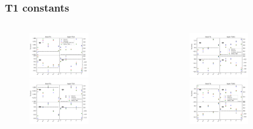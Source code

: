 \documentclass[aspectratio=1610, 12pt]{beamer}
\begin{document}
\begin{frame}\frametitle{T1 constants}
  \begin{columns}
    \begin{column}[c]{0.5\textwidth}
      \begin{figure}
        \includegraphics[width=0.6\textwidth]{plots/compi/Tx/blue_red_comp_T1U_Tx.pdf}
        \includegraphics[width=0.6\textwidth]{plots/compi/Tx/blue_red_comp_T1V_Tx.pdf}
      \end{figure}
    \end{column}
    \begin{column}[c]{0.5\textwidth}
      \begin{figure}
        \includegraphics[width=0.6\textwidth]{plots/compi/Tx/blue_red_comp_T1X1_Tx.pdf}
        \includegraphics[width=0.6\textwidth]{plots/compi/Tx/blue_red_comp_T1X2_Tx.pdf}

\end{figure}
\end{column}
\end{columns}
\end{frame}
\end{document}
